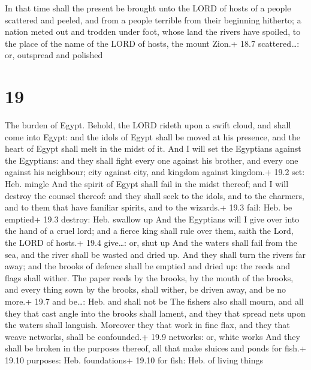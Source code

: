  In that time shall the present be brought unto the LORD
of hosts of a people scattered and peeled, and from a people terrible
from their beginning hitherto; a nation meted out and trodden under
foot, whose land the rivers have spoiled, to the place of the name of
the LORD of hosts, the mount Zion.+ 18.7 scattered\ldots: or, outspread
and polished

\hypertarget{section-18}{%
\section{19}\label{section-18}}

 The burden of Egypt. Behold, the LORD rideth upon a swift
cloud, and shall come into Egypt: and the idols of Egypt shall be moved
at his presence, and the heart of Egypt shall melt in the midst of it.
 And I will set the Egyptians against the Egyptians: and
they shall fight every one against his brother, and every one against
his neighbour; city against city, and kingdom against kingdom.+ 19.2
set: Heb. mingle  And the spirit of Egypt shall fail in the
midst thereof; and I will destroy the counsel thereof: and they shall
seek to the idols, and to the charmers, and to them that have familiar
spirits, and to the wizards.+ 19.3 fail: Heb. be emptied+ 19.3 destroy:
Heb. swallow up  And the Egyptians will I give over into the
hand of a cruel lord; and a fierce king shall rule over them, saith the
Lord, the LORD of hosts.+ 19.4 give\ldots: or, shut up  And
the waters shall fail from the sea, and the river shall be wasted and
dried up.  And they shall turn the rivers far away; and the
brooks of defence shall be emptied and dried up: the reeds and flags
shall wither.  The paper reeds by the brooks, by the mouth
of the brooks, and every thing sown by the brooks, shall wither, be
driven away, and be no more.+ 19.7 and be\ldots: Heb. and shall not be
 The fishers also shall mourn, and all they that cast angle
into the brooks shall lament, and they that spread nets upon the waters
shall languish.  Moreover they that work in fine flax, and
they that weave networks, shall be confounded.+ 19.9 networks: or, white
works  And they shall be broken in the purposes thereof,
all that make sluices and ponds for fish.+ 19.10 purposes: Heb.
foundations+ 19.10 for fish: Heb. of living things

